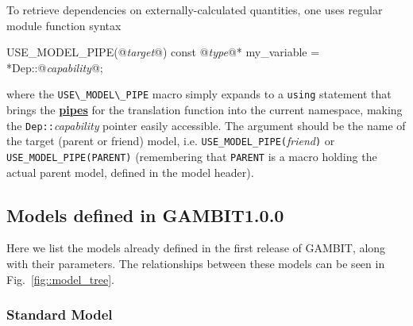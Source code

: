 \documentclass[pdftex,twocolumn,epjc3_preprint,runningheads]{svjour3}
\renewcommand{\_}{\discretionary{\underscore}{}{\underscore}}
\newcommand\cpp[1]{{\lstinline!#1!}}  %
\newcommand{\doublecross}[2]{\hyperref[#2]{\textbf{#1}}}
\newcommand{\metavarf}[1]{\textit{\color{darkgreen}\footnotesize\textrm{#1}}}
\newcommand{\metavar}{\metavarf}
\newcommand{\gambit}{\textsf{GAMBIT}\xspace}
\newcommand{\GB}{\gambit}
\begin{document}
To retrieve dependencies on externally-calculated quantities, one uses regular module function syntax
\begin{lstcpp}
USE_MODEL_PIPE(@\metavar{target}@)
const @\metavar{type}@* my_variable = *Dep::@\metavar{capability}@;
\end{lstcpp}
where the \cpp{USE\_MODEL\_PIPE} macro simply expands to a \cpp{using} statement that brings the \doublecross{pipes}{pipe} for the translation function into the current namespace, making the \cpp{Dep::}\metavar{capability} pointer easily accessible. The argument should be the name of the target (parent or friend) model, i.e. \cpp{USE_MODEL_PIPE(}\metavar{friend}\cpp{)} or \cpp{USE_MODEL_PIPE(PARENT)} (remembering that \cpp{PARENT} is a macro holding the actual parent model, defined in the model header).

\subsection{Models defined in \GB \textsf{1.0.0}}
\label{inventory}

Here we list the models already defined in the first release of \GB, along with their parameters.  The relationships between these models can be seen in Fig.\ \ref{fig::model_tree}.

\subsubsection{Standard Model}
\end{document}
